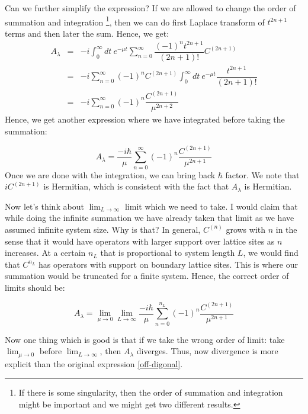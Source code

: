\documentclass[11pt,a4paper]{article}
\begin{document}
Can we further simplify the expression? If we are allowed to change the order of summation and integration \footnote{If there is some singularity, then the order of summation and integration might be important and we might get two different results.}, then we can do first Laplace transform of $t ^{2n+1}$  terms and then later the sum.  Hence, we get:
\begin{eqnarray}
A_{\lambda} &=& - i  \int_0^{\infty} dt\ e^{-\mu t} \sum_{n=0}^{\infty} \dfrac{(-1)^{n} t ^{2n+1}}{(2n+1)!} C^{(2n+1)} \\
 &=& - i \sum_{n=0}^{\infty}(-1)^{n} C^{(2n+1)} \int_0^{\infty} dt\ e^{-\mu t}  \dfrac{ t ^{2n+1}}{(2n+1)!} \\
 &=& - i  \sum_{n=0}^{\infty}   (-1)^{n} \dfrac{ C^{(2n+1)}}{\mu^{2n+2}}
\end{eqnarray}
Hence, we get another expression where we have integrated before taking the summation:

\begin{equation}
 A_{\lambda} =  \dfrac{-i\hbar}{\mu}  \sum_{n=0}^{\infty}   (-1)^{n} \dfrac{ C^{(2n+1)}}{\mu^{2n+1}}
\label{def_2}
\end{equation}
Once we are done with the integration, we can bring back $\hbar$ factor. We note that $i C^{(2n+1)}$ is Hermitian, which is consistent with the fact that $ A_{\lambda}$ is Hermitian. 


Now let's think about $\lim_{L \rightarrow \infty }$ limit which we need to take. I  would claim that while doing the infinite summation we have already taken that limit as we have assumed infinite system size. Why is that? In general,  $C^{(n)}$ grows with $n$ in the sense that it would have operators with larger support over lattice sites as $n$ increases. At a certain  $n_L$ that is proportional to system length $L$, we would find that $C^{n_L}$ has operators with support on boundary lattice sites. This is where our summation would be truncated for a finite system. Hence, the correct order of limits should be:

\begin{equation}
\boxed{ A_{\lambda} =   \lim_{\mu \rightarrow 0} \lim_{L \rightarrow \infty } \dfrac{-i\hbar}{\mu}  \sum_{n=0}^{n_L}   (-1)^{n} \dfrac{ C^{(2n+1)}}{\mu^{2n+1}}}
\end{equation}

Now one thing which is good is that if we take the wrong order of limit: take $\lim_{\mu \rightarrow 0}$ before $\lim_{L \rightarrow \infty }$, then $A_{\lambda}$ diverges. Thus, now divergence is more explicit than the original expression \ref{off-digonal}. 
\end{document}
